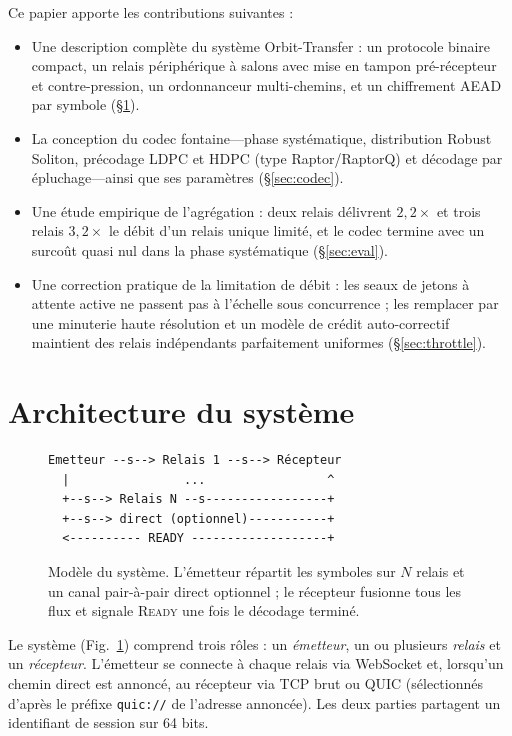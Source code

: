 \documentclass[conference]{IEEEtran}
\begin{document}
Ce papier apporte les contributions suivantes :
\begin{itemize}
\item Une description complète du système Orbit-Transfer : un protocole binaire
compact, un relais périphérique à salons avec mise en tampon pré-récepteur et
contre-pression, un ordonnanceur multi-chemins, et un chiffrement AEAD par
symbole (\S\ref{sec:arch}).
\item La conception du codec fontaine---phase systématique, distribution
Robust Soliton, précodage LDPC et HDPC (type Raptor/RaptorQ) et décodage par
épluchage---ainsi que ses paramètres (\S\ref{sec:codec}).
\item Une étude empirique de l'agrégation : deux relais délivrent $2{,}2\times$
et trois relais $3{,}2\times$ le débit d'un relais unique limité, et le codec
termine avec un surcoût quasi nul dans la phase systématique
(\S\ref{sec:eval}).
\item Une correction pratique de la limitation de débit : les seaux de jetons
à attente active ne passent pas à l'échelle sous concurrence ; les remplacer
par une minuterie haute résolution et un modèle de crédit auto-correctif
maintient des relais indépendants parfaitement uniformes
(\S\ref{sec:throttle}).
\end{itemize}

\section{Architecture du système}
\label{sec:arch}

\begin{figure}[!t]
\centering
\scriptsize
\begin{minipage}{0.95\columnwidth}
\begin{verbatim}
Emetteur --s--> Relais 1 --s--> Récepteur
  |                ...                 ^
  +--s--> Relais N --s-----------------+
  +--s--> direct (optionnel)-----------+
  <---------- READY -------------------+
\end{verbatim}
\end{minipage}
\caption{Modèle du système. L'émetteur répartit les symboles sur $N$ relais et
un canal pair-à-pair direct optionnel ; le récepteur fusionne tous les flux et
signale \textsc{Ready} une fois le décodage terminé.}
\label{fig:system}
\end{figure}

Le système (Fig.~\ref{fig:system}) comprend trois rôles : un \emph{émetteur},
un ou plusieurs \emph{relais} et un \emph{récepteur}. L'émetteur se connecte à
chaque relais via WebSocket et, lorsqu'un chemin direct est annoncé, au
récepteur via TCP brut ou QUIC (sélectionnés d'après le préfixe
\texttt{quic://} de l'adresse annoncée). Les deux parties partagent un
identifiant de session sur 64 bits.
\end{document}
